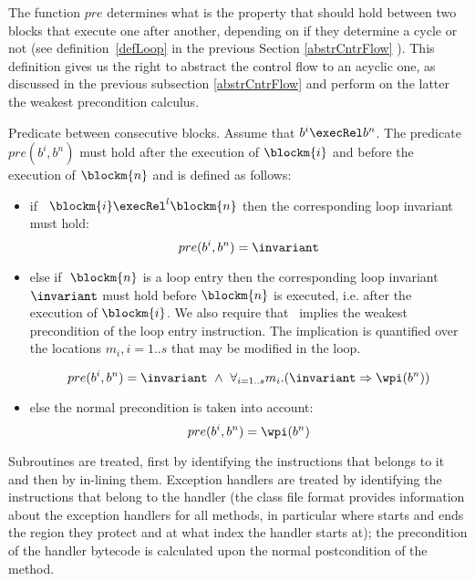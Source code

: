 The function  $pre$ determines what is the property that should hold between two blocks that execute one after another,
depending on if they determine a cycle or not (see definition~\ref{defLoop} in the previous Section \ref{abstrCntrFlow} ).  This definition
gives us the right to abstract the control flow to an acyclic one, as discussed in the previous subsection \ref{abstrCntrFlow} and perform on the latter the weakest precondition calculus.  
\begin{definition}
{Predicate between consecutive blocks.}\label{post2}
Assume that $b^i \execRel b^n$. The predicate $pre(b^{i}, b^{n})$ must hold after the execution of $\blockm{i}$ and before the execution of $\blockm{n}$ and is defined as follows:
\begin{itemize}
\item if \ $\blockm{i} \execRel^l \blockm{n}$ 
then the corresponding loop invariant must hold:
$$
pre(b^{i}, b^{n}) =  \invariant
$$

\item else if $\ \blockm{n}$ is a loop entry then the corresponding loop invariant $\invariant$ must hold before $\blockm{n}$ is executed, i.e. after the execution of $\blockm{i}$. We also require that \invariant \ implies the weakest precondition of the loop entry instruction. The implication is quantified over the locations $m_i , i= 1..s$ that may be modified in the loop.

$$
pre(b^{i}, b^{n}) = \invariant \ \wedge \ \forall_{i = 1..s} m_i.(
\invariant \Rightarrow \wpi(b^{n}))
$$
\item else the normal precondition is taken into account:
$$
pre(b^{i}, b^{n}) = \wpi(b^{n})
$$
\end{itemize}
\end{definition}

Subroutines are treated, first by identifying the instructions that belongs to it and then by in-lining them. Exception handlers are 
treated by identifying the instructions that belong to the handler (the class file format provides information about the exception handlers for all methods, in particular where starts and ends the region 
they protect and at what index the handler starts at); the precondition of the handler bytecode is calculated upon the normal postcondition of the method.

